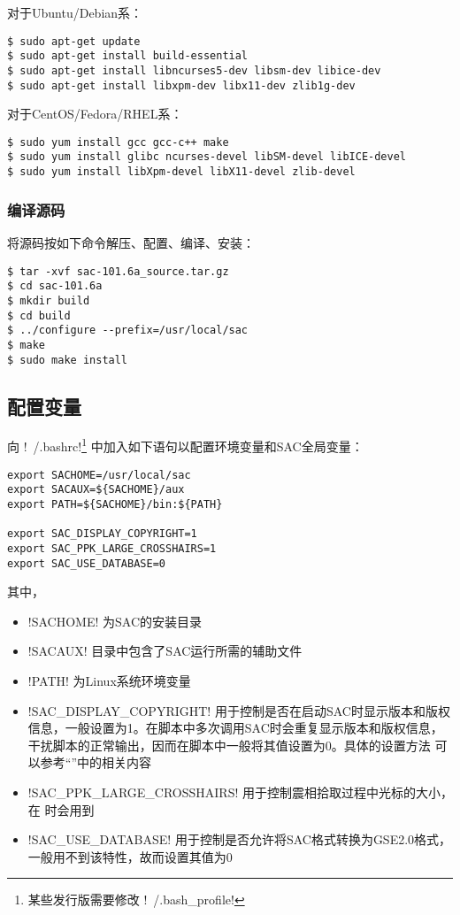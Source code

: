 对于Ubuntu/Debian系：
\begin{verbatim}
$ sudo apt-get update
$ sudo apt-get install build-essential
$ sudo apt-get install libncurses5-dev libsm-dev libice-dev
$ sudo apt-get install libxpm-dev libx11-dev zlib1g-dev
\end{verbatim}

对于CentOS/Fedora/RHEL系：
\begin{verbatim}
$ sudo yum install gcc gcc-c++ make
$ sudo yum install glibc ncurses-devel libSM-devel libICE-devel
$ sudo yum install libXpm-devel libX11-devel zlib-devel
\end{verbatim}

\subsubsection{编译源码}
将源码按如下命令解压、配置、编译、安装：
\begin{verbatim}
$ tar -xvf sac-101.6a_source.tar.gz
$ cd sac-101.6a
$ mkdir build
$ cd build
$ ../configure --prefix=/usr/local/sac
$ make
$ sudo make install
\end{verbatim}

\subsection{配置变量}
向 !~/.bashrc!\footnote{某些发行版需要修改 !~/.bash_profile!}
中加入如下语句以配置环境变量和SAC全局变量：
\begin{verbatim}
export SACHOME=/usr/local/sac
export SACAUX=${SACHOME}/aux
export PATH=${SACHOME}/bin:${PATH}

export SAC_DISPLAY_COPYRIGHT=1
export SAC_PPK_LARGE_CROSSHAIRS=1
export SAC_USE_DATABASE=0
\end{verbatim}

其中，
\begin{itemize}
\item !SACHOME! 为SAC的安装目录
\item !SACAUX! 目录中包含了SAC运行所需的辅助文件
\item !PATH! 为Linux系统环境变量
\item !SAC_DISPLAY_COPYRIGHT! 用于控制是否在启动SAC时显示版本和版权
    信息，一般设置为1。在脚本中多次调用SAC时会重复显示版本和版权信息，
    干扰脚本的正常输出，因而在脚本中一般将其值设置为0。具体的设置方法
    可以参考``''中的相关内容
\item !SAC_PPK_LARGE_CROSSHAIRS! 用于控制震相拾取过程中光标的大小，
    在  时会用到
\item !SAC_USE_DATABASE! 用于控制是否允许将SAC格式转换为GSE2.0格式，
    一般用不到该特性，故而设置其值为0
\end{itemize}

